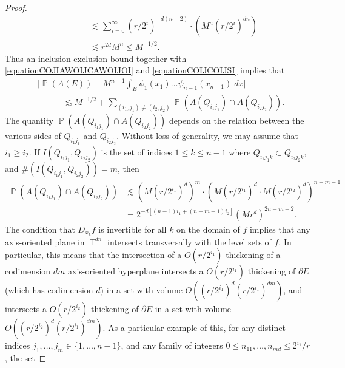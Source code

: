 \documentclass[dvipsnames,letterpaper,12pt]{article}
\numberwithin{equation}{section}
\DeclareMathOperator{\TT}{\mathbb{T}}
\numberwithin{theorem}{section}
\DeclareMathOperator{\PP}{\mathbb{P}}
\begin{document}
\begin{proof}
\begin{equation}
\begin{split}
        &\quad\quad\quad\lesssim \sum_{i = 0}^\infty (r/2^i)^{-d(n-2)} \cdot \left( M^n (r/2^i)^{dn} \right)\\
        &\quad\quad\quad\lesssim r^{2d} M^n \leq M^{-1/2}.
    \end{split}
    \end{equation}
    Thus an inclusion exclusion bound together with \eqref{equationCOJIAWOIJCAWOIJOI} and \eqref{equationCOIJCOIJSI} implies that
    \begin{equation} \label{equationvVIDJDIJ21312ffijsijds}
    \begin{split}
        &\Big| \PP(A(E)) - M^{n-1} \int_E \psi_1(x_1) \dots \psi_{n-1}(x_{n-1})\; dx \Big|\\
        &\quad\quad\quad \lesssim M^{-1/2} + \sum_{(i_1,j_1) \neq (i_2,j_2)} \PP(A(Q_{i_1j_1}) \cap A(Q_{i_2j_2})).
    \end{split}
    \end{equation}
    The quantity $\PP(A(Q_{i_1j_1}) \cap A(Q_{i_2j_2}))$ depends on the relation between the various sides of $Q_{i_1j_1}$ and $Q_{i_2j_2}$. Without loss of generality, we may assume that $i_1 \geq i_2$. If $I(Q_{i_1j_1},Q_{i_2j_2})$ is the set of indices $1 \leq k \leq n-1$ where $Q_{i_1j_1k} \subset Q_{i_2j_2k}$, and $\#(I(Q_{i_1j_1}, Q_{i_2j_2})) = m$, then
    \begin{equation} \label{equationVOIJVIJISJCISJCIEWJRIJI43234}
    \begin{split}
        \PP(A(Q_{i_1j_1}) \cap A(Q_{i_2j_2})) &\lesssim (M(r/2^{i_1})^d)^m \cdot (M(r/2^{i_1})^d \cdot M(r/2^{i_2})^d)^{n-m-1}\\
        &= 2^{-d[(n-1)i_1 + (n-m-1)i_2]} (Mr^d)^{2n - m-2}.
    \end{split}
    \end{equation}
    The condition that $D_{x_k} f$ is invertible for all $k$ on the domain of $f$ implies that any axis-oriented plane in $\TT^{dn}$ intersects transversally with the level sets of $f$. In particular, this means that the intersection of a $O(r/2^{i_1})$ thickening of a codimension $dm$ axis-oriented hyperplane intersects a $O(r/2^{i_1})$ thickening of $\partial E$ (which has codimension $d$) in a set with volume $O \left( (r/2^{i_1})^d (r/2^{i_1})^{dm} \right)$, and intersects a $O(r/2^{i_2})$ thickening of $\partial E$ in a set with volume $O \left( (r/2^{i_2})^d (r/2^{i_1})^{dm} \right)$. As a particular example of this, for any distinct indices $j_1,\dots,j_m \in \{ 1,\dots, n-1 \}$, and any family of integers $0 \leq n_{11},\dots,n_{md} \leq 2^{i_1}/r$, the set

\end{proof}
\end{document}
